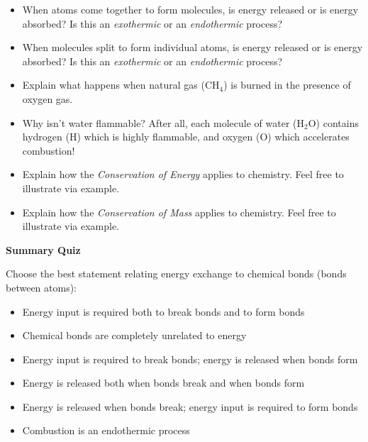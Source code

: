 \begin{itemize}
\item{} When atoms come together to form molecules, is energy released or is energy absorbed?  Is this an {\it exothermic} or an {\it endothermic} process?
\item{} When molecules split to form individual atoms, is energy released or is energy absorbed?  Is this an {\it exothermic} or an {\it endothermic} process?
\item{} Explain what happens when natural gas (CH$_{4}$) is burned in the presence of oxygen gas.
\item{} Why isn't water flammable?  After all, each molecule of water (H$_{2}$O) contains hydrogen (H) which is highly flammable, and oxygen (O) which accelerates combustion! 
\item{} Explain how the {\it Conservation of Energy} applies to chemistry.  Feel free to illustrate via example.
\item{} Explain how the {\it Conservation of Mass} applies to chemistry.  Feel free to illustrate via example.
\end{itemize}







\vfil \eject

\noindent
{\bf Summary Quiz}

Choose the best statement relating energy exchange to chemical bonds (bonds between atoms):

\begin{itemize}
\item{} Energy input is required both to break bonds and to form bonds
\vskip 5pt
\item{} Chemical bonds are completely unrelated to energy
\vskip 5pt
\item{} Energy input is required to break bonds; energy is released when bonds form
\vskip 5pt
\item{} Energy is released both when bonds break and when bonds form
\vskip 5pt
\item{} Energy is released when bonds break; energy input is required to form bonds
\vskip 5pt
\item{} Combustion is an endothermic process
\end{itemize}





